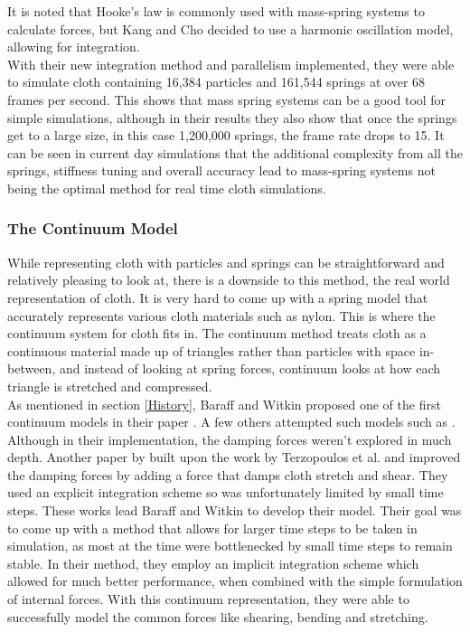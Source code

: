 \documentclass[12pt,a4paper]{article}
\begin{document}
It is noted that Hooke's law is commonly used with mass-spring systems to calculate forces, but Kang and Cho decided to use a harmonic oscillation model, allowing for integration.\\
With their new integration method and parallelism implemented, they were able to simulate cloth containing 16,384 particles and 161,544 springs at  over 68 frames per second. This shows that mass spring systems can be a good tool for simple simulations, although in their results they also show that once the springs get to a large size, in this case 1,200,000 springs, the frame rate drops to 15. It can be seen in current day simulations that the additional complexity from all the springs, stiffness tuning and overall accuracy lead to mass-spring systems not being the optimal method for real time cloth simulations.

\subsubsection{The Continuum Model}
While representing cloth with particles and springs can be straightforward and relatively pleasing to look at, there is a downside to this method, the real world representation of cloth. It is very hard to come up with a spring model that accurately represents various cloth materials such as nylon. This is where the continuum system for cloth fits in. The continuum method treats cloth as a continuous material made up of triangles rather than particles with space in-between, and instead of looking at spring forces, continuum looks at how each triangle is stretched and compressed. \\

As mentioned in section \ref{History}, Baraff and Witkin proposed one of the first continuum models in their paper \cite{Baraff1998largesteps}. A few others attempted such models such as \cite{terzopoulos1987elastically}. Although in their implementation, the damping forces weren't explored in much depth. Another paper by \cite{carignanclothy} built upon the work by Terzopoulos et al. and improved the damping forces by adding a force that damps cloth stretch and shear. They used an explicit integration scheme so was unfortunately limited by small time steps. These works lead Baraff and Witkin to develop their model. Their goal was to come up with a method that allows for larger time steps to be taken in simulation, as most at the time were bottlenecked by small time steps to remain stable. In their method, they employ an implicit integration scheme which allowed for much better performance, when combined with the simple formulation of internal forces. With this continuum representation, they were able to successfully model the common forces like shearing, bending and stretching. \\ 
\end{document}
